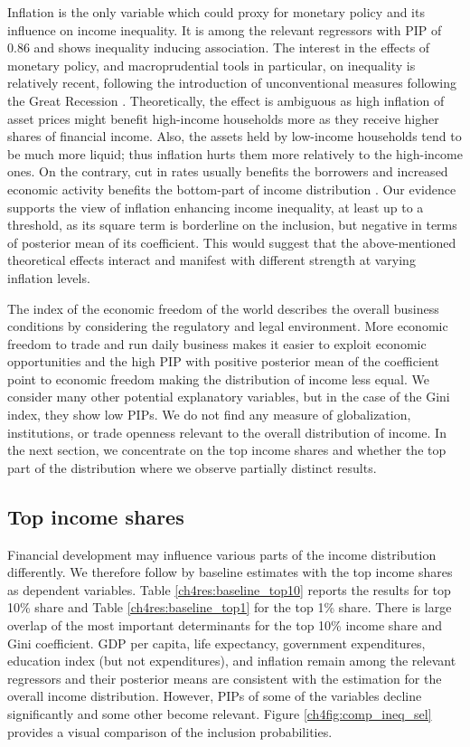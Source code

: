 \begin{refsection}
  Inflation is the only variable which could proxy for monetary policy and its influence on income inequality. It is among the relevant regressors with \ac{PIP} of 0.86 and shows inequality inducing association. The interest in the effects of monetary policy, and macroprudential tools in particular, on inequality is relatively recent, following the introduction of unconventional measures following the Great Recession \parencite{frost2018macroprudential}. Theoretically, the effect is ambiguous as high inflation of asset prices might benefit high-income households more as they receive higher shares of financial income. Also, the assets held by low-income households tend to be much more liquid; thus inflation hurts them more relatively to the high-income ones. On the contrary, cut in rates usually benefits the borrowers and increased economic activity benefits the bottom-part of income distribution \parencite{furceri2019robust}. Our evidence supports the view of inflation enhancing income inequality, at least up to a threshold, as its square term is borderline on the inclusion, but negative in terms of posterior mean of its coefficient. This would suggest that the above-mentioned theoretical effects interact and manifest with different strength at varying inflation levels.
  
  The index of the economic freedom of the world describes the overall business conditions by considering the regulatory and legal environment. More economic freedom to trade and run daily business makes it easier to exploit economic opportunities and the high \ac{PIP} with positive posterior mean of the coefficient point to economic freedom making the distribution of income less equal. We consider many other potential explanatory variables, but in the case of the Gini index, they show low \acp{PIP}. We do not find any measure of globalization, institutions, or trade openness relevant to the overall distribution of income. In the next section, we concentrate on the top income shares and whether the top part of the distribution where we observe partially distinct results.
  
  \subsection{Top income shares}
  Financial development may influence various parts of the income distribution differently. We therefore follow by baseline estimates with the top income shares as dependent variables. Table \ref{ch4res:baseline_top10} reports the results for top 10\% share and Table \ref{ch4res:baseline_top1} for the top 1\% share. There is large overlap of the most important determinants for the top 10\% income share and Gini coefficient. GDP per capita, life expectancy, government expenditures, education index (but not expenditures), and inflation remain among the relevant regressors and their posterior means are consistent with the estimation for the overall income distribution. However, \acp{PIP} of some of the variables decline significantly and some other become relevant. Figure \ref{ch4fig:comp_ineq_sel} provides a visual comparison of the inclusion probabilities.


\end{refsection}
